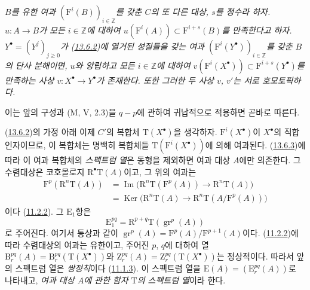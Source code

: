 \begin{corollary}[13.6.3]
\label{0.13.6.3-fr}
\emph{$B$를 유한 여과 $(\mathrm F^i(B))_{i\in\mathbb Z}$를 갖춘
$C$의 또 다른 대상, $s$를 정수라 하자. $u:A\to B$가 모든
$i\in\mathbb Z$에 대하여
$u(\mathrm F^i(A))\subset\mathrm F^{i+s}(B)$를 만족한다고 하자.
$Y^\bullet=(Y^j)_{j\geq0}$가
(\hyperref[0.13.6.2-fr]{13.6.2})에 열거된 성질들을 갖는 여과
$(\mathrm F^i(Y^\bullet))_{i\in\mathbb Z}$를 갖춘 $B$의 단사
분해이면, $u$와 양립하고 모든 $i\in\mathbb Z$에 대하여
$v(\mathrm F^i(X^\bullet))\subset\mathrm F^{i+s}(Y^\bullet)$를
만족하는 사상 $v:X^\bullet\to Y^\bullet$가 존재한다. 또한 그러한
두 사상 $v$, $v'$는 서로 호모토픽하다.}
\end{corollary}

이는 앞의 구성과 (M, V, 2.3)을 $q-p$에 관하여 귀납적으로 적용하면
곧바로 따른다.

\begin{env}[13.6.4]
\label{0.13.6.4-fr}
(\hyperref[0.13.6.2-fr]{13.6.2})의 가정 아래 이제 $C'$의 복합체
$\mathrm T(X^\bullet)$을 생각하자. $\mathrm F^i(X^\bullet)$이
$X^\bullet$의 직합인자이므로, 이 복합체는 명백히 복합체들
$\mathrm T(\mathrm F^i(X^\bullet))$에 의해 여과된다.
(\hyperref[0.13.6.3-fr]{13.6.3})에 따라 이 여과 복합체의
\emph{스펙트럼 열}은 동형을 제외하면 여과 대상 $A$에만 의존한다.
그 수렴대상은 코호몰로지 $\mathrm R^\bullet\mathrm T(A)$이고, 그 위의
여과는
\begin{equation}
\label{0.13.6.4.1-fr}
\tag{13.6.4.1}
\begin{split}
\mathrm F^p(\mathrm R^n\mathrm T(A))
&=\operatorname{Im}\bigl(\mathrm R^n\mathrm T(\mathrm F^p(A))
\longrightarrow\mathrm R^n\mathrm T(A)\bigr)\\
&=\operatorname{Ker}\bigl(\mathrm R^n\mathrm T(A)
\longrightarrow\mathrm R^n\mathrm T(A/\mathrm F^p(A))\bigr)
\end{split}
\end{equation}
이다 (\hyperref[0.11.2.2-fr]{11.2.2}). 그 $\mathrm E_1$항은
\begin{equation}
\label{0.13.6.4.2-fr}
\tag{13.6.4.2}
\mathrm E_1^{pq}=\mathrm R^{p+q}\mathrm T(\operatorname{gr}^p(A))
\end{equation}
로 주어진다. 여기서 통상과 같이
$\operatorname{gr}^p(A)=\mathrm F^p(A)/\mathrm F^{p+1}(A)$이다.
(\hyperref[0.11.2.2-fr]{11.2.2})에 따라 수렴대상의 여과는 유한이고,
주어진 $p$, $q$에 대하여 열
$\mathrm B_r^{pq}(A)=\mathrm B_r^{pq}(\mathrm T(X^\bullet))$와
$\mathrm Z_r^{pq}(A)=\mathrm Z_r^{pq}(\mathrm T(X^\bullet))$는
정상적이다. 따라서 앞의 스펙트럼 열은 \emph{쌍정칙}이다
(\hyperref[0.11.1.3-fr]{11.1.3}). 이 스펙트럼 열을
$\mathrm E(A)=(\mathrm E_r^{pq}(A))$로 나타내고,
\emph{여과 대상 $A$에 관한 함자 $\mathrm T$의 스펙트럼 열}이라 한다.
\end{env}

